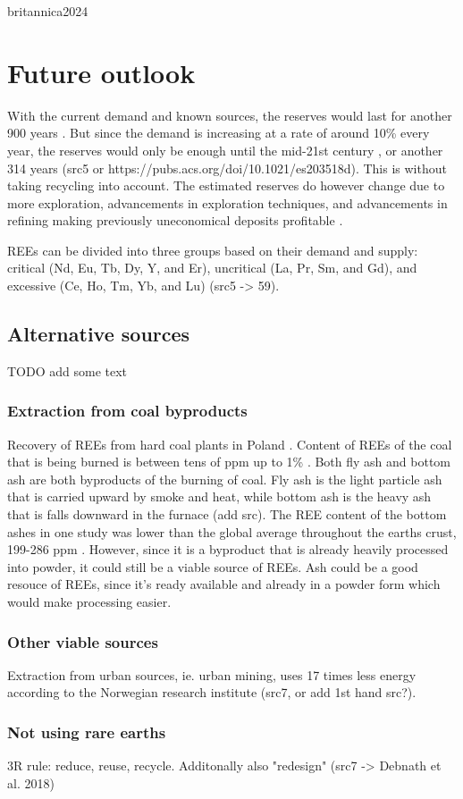 britannica2024
\section{Future outlook}

With the current demand and known sources, the reserves would last for another 900 years \cite{britannica2024}. But since the demand is increasing at a rate of around 10\% every year, the reserves would only be enough until the mid-21st century \cite{britannica2024}, or another 314 years (src5 or https://pubs.acs.org/doi/10.1021/es203518d). This is without taking recycling into account. The estimated reserves do however change due to more exploration, advancements in exploration techniques, and advancements in refining making previously uneconomical deposits profitable \cite{REETechnology}.

REEs can be divided into three groups based on their demand and supply: critical (Nd, Eu,
Tb, Dy, Y, and Er), uncritical (La, Pr, Sm, and Gd), and excessive (Ce, Ho, Tm, Yb, and Lu) (src5 -> 59).

\subsection{Alternative sources}
TODO add some text

\subsubsection{Extraction from coal byproducts}

Recovery of REEs from hard coal plants in Poland \cite{USDoE2024}. Content of REEs of the coal that is being burned is between tens of ppm up to 1\% \cite{coalPoland}. Both fly ash and bottom ash are both byproducts of the burning of coal. Fly ash is the light particle ash that is carried upward by smoke and heat, while bottom ash is the heavy ash that is falls downward in the furnace (add src). The REE content of the bottom ashes in one study was lower than the global average throughout the earths crust, 199-286 ppm \cite{coalPoland}. However, since it is a byproduct that is already heavily processed into powder, it could still be a viable source of REEs. Ash could be a good resouce of REEs, since it's ready available and already in a powder form which would make processing easier.

\subsubsection{Other viable sources}

Extraction from urban sources, ie. urban mining, uses 17 times less energy according to the Norwegian research institute (src7, or add 1st hand src?).

\subsubsection{Not using rare earths}

3R rule: reduce, reuse, recycle. Additonally also "redesign" (src7 -> Debnath et al. 2018)


